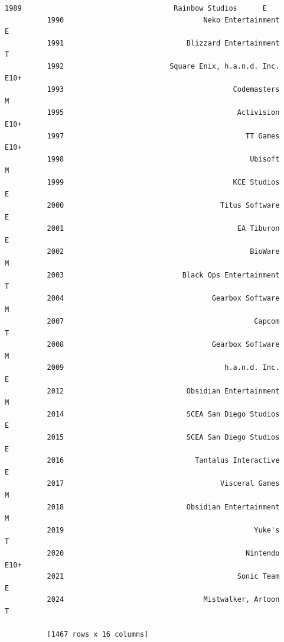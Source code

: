 \documentclass[11pt]{article}
\begin{document}
\begin{Verbatim}[commandchars=\\\{\}]
          1989                                    Rainbow Studios      E  
          1990                                 Neko Entertainment      E  
          1991                             Blizzard Entertainment      T  
          1992                         Square Enix, h.a.n.d. Inc.   E10+  
          1993                                        Codemasters      M  
          1995                                         Activision   E10+  
          1997                                           TT Games   E10+  
          1998                                            Ubisoft      M  
          1999                                        KCE Studios      E  
          2000                                     Titus Software      E  
          2001                                         EA Tiburon      E  
          2002                                            BioWare      M  
          2003                            Black Ops Entertainment      T  
          2004                                   Gearbox Software      M  
          2007                                             Capcom      T  
          2008                                   Gearbox Software      M  
          2009                                      h.a.n.d. Inc.      E  
          2012                             Obsidian Entertainment      M  
          2014                             SCEA San Diego Studios      E  
          2015                             SCEA San Diego Studios      E  
          2016                               Tantalus Interactive      E  
          2017                                     Visceral Games      M  
          2018                             Obsidian Entertainment      M  
          2019                                             Yuke's      T  
          2020                                           Nintendo   E10+  
          2021                                         Sonic Team      E  
          2024                                 Mistwalker, Artoon      T  
          
          [1467 rows x 16 columns]
\end{Verbatim}
            
\end{document}
